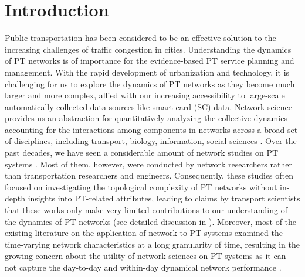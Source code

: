 \documentclass[a4paper,fleqn]{cas-sc}
\begin{document}
\section{Introduction}
Public transportation has been considered to be an effective solution to the increasing challenges of traffic congestion in cities. Understanding the dynamics of PT networks is of importance for the evidence-based PT service planning and management. With the rapid development of urbanization and technology, it is challenging for us to explore the dynamics of PT networks as they become much larger and more complex, allied with our increasing accessibility to large-scale automatically-collected data sources like smart card (SC) data. Network science provides us an abstraction for quantitatively analyzing the collective dynamics accounting for the interactions among components in networks across a broad set of disciplines, including transport, biology, information, social sciences \citep{de2004fluctuations,vogels2005neural,tyson2001network,coviello2006network,snijders2010introduction}. Over the past decades, we have seen a considerable amount of network studies on PT systems \citep{wu2004urban,ping2006topological,lu2007complexity,qing2013space,zhang2019quantitatively}. Most of them, however, were conducted by network researchers rather than transportation researchers and engineers. Consequently, these studies often focused on investigating the topological complexity of PT networks without in-depth insights into PT-related attributes, leading to claims by transport scientists that these works only make very limited contributions to our understanding of the dynamics of PT networks (see detailed discussion in \cite{luo2019integrating}). Moreover, most of the existing literature on the application of network to PT systems examined the time-varying network characteristics at a long granularity of time, resulting in the growing concern about the utility of network sciences on PT systems as it can not capture the day-to-day and within-day dynamical network performance \citep{leng2014evaluating,ding2015complex,zhu2016evolution,cats2017topological}. 
\end{document}
